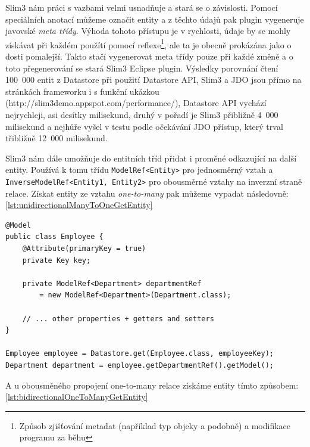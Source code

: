 Slim3 nám práci s vazbami velmi usnadňuje a stará se o závislosti. Pomocí speciálních anotací můžeme označit entity a z těchto údajů pak plugin vygeneruje javovské \emph{meta třídy}. Výhoda tohoto přístupu je v rychlosti, údaje by se mohly získávat při každém použítí pomocí reflexe\footnote{Způsob zjišťování metadat (například typ objeky a podobně) a modifikace programu za běhu}, ale ta je obecně  prokázána jako o dosti pomalejší. Takto stačí vygenerovat meta třídy pouze při každé změně a o toto přegenerování se stará Slim3 Eclipse plugin. Výsledky porovnání čtení 100~000 entit z Datastore při použití Datastore API, Slim3 a JDO jsou přímo na stránkách frameworku i s funkční ukázkou (http://slim3demo.appspot.com/performance/), Datastore API vychází nejrychleji, asi desítky milisekund, druhý v pořadí je Slim3 přibližně 4~000 milisekund a nejhůře vyšel v testu podle očekávání JDO přístup, který trval třibližně 12~000 milisekund. 

Slim3 nám dále umožňuje do entitních tříd přidat i proměné odkazující na další entity. Používá k tomu třídu \verb|ModelRef<Entity>| pro jednosměrný vztah a \verb| InverseModelRef<Entity1, Entity2>| pro obousměrné vztahy na inverzní straně relace. Získat entity ze vztahu \emph{one-to-many} pak můžeme vypadat následovně: \ref{lst:unidirectionalManyToOneGetEntity}

\begin{lstlisting}[caption={Získání entity},label=lst:unidirectionalManyToOneGetEntity,belowcaptionskip=0.4cm]
@Model
public class Employee {
	@Attribute(primaryKey = true)
	private Key key;
	
	private ModelRef<Department> departmentRef 
		= new ModelRef<Department>(Department.class);
	
	// ... other properties + getters and setters
}

Employee employee = Datastore.get(Employee.class, employeeKey);
Department department = employee.getDepartmentRef().getModel();
\end{lstlisting}

A u obousměného propojení one-to-many relace získáme entity tímto způsobem: \ref{lst:bidirectionalOneToManyGetEntity}

